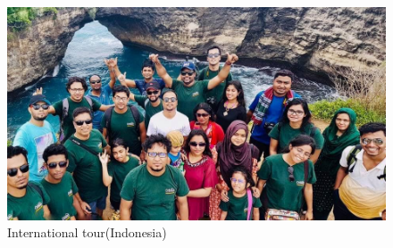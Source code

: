 \begin{flushleft}
\begin{figure}[htbp]
\centerline{\includegraphics[scale=0.5]{Figures/m.jpg}}
\caption{International tour(Indonesia)}
\label{fig}
\end{figure}

\end{flushleft}